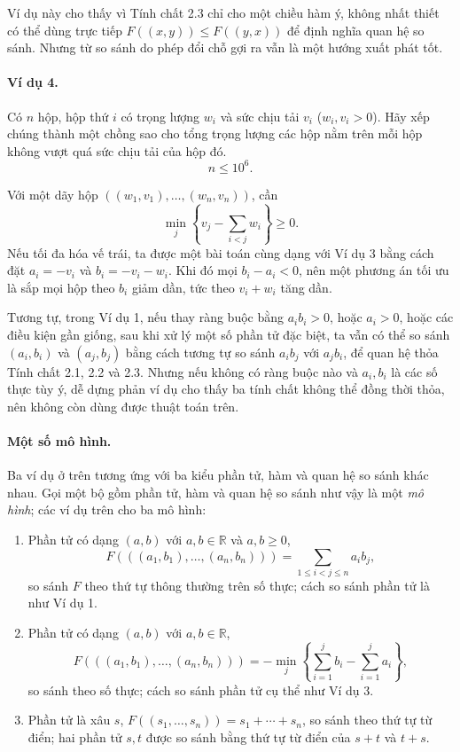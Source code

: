 \documentclass[11pt]{article}
\begin{document}
Ví dụ này cho thấy vì Tính chất 2.3 chỉ cho một chiều hàm ý, không nhất thiết có
thể dùng trực tiếp $F((x,y))\le F((y,x))$ để định nghĩa quan hệ so sánh. Nhưng
từ so sánh do phép đổi chỗ gợi ra vẫn là một hướng xuất phát tốt.

\paragraph{Ví dụ 4.}
Có $n$ hộp, hộp thứ $i$ có trọng lượng $w_i$ và sức chịu tải $v_i$
($w_i,v_i>0$). Hãy xếp chúng thành một chồng sao cho tổng trọng lượng các hộp
nằm trên mỗi hộp không vượt quá sức chịu tải của hộp đó.
\[
  n\le 10^6.
\]

Với một dãy hộp $((w_1,v_1),\ldots,(w_n,v_n))$, cần
\[
  \min_j\left\{v_j-\sum_{i<j} w_i\right\}\ge 0.
\]
Nếu tối đa hóa vế trái, ta được một bài toán cùng dạng với Ví dụ 3 bằng cách đặt
$a_i=-v_i$ và $b_i=-v_i-w_i$. Khi đó mọi $b_i-a_i<0$, nên một phương án tối ưu
là sắp mọi hộp theo $b_i$ giảm dần, tức theo $v_i+w_i$ tăng dần.

Tương tự, trong Ví dụ 1, nếu thay ràng buộc bằng $a_ib_i>0$, hoặc $a_i>0$, hoặc
các điều kiện gần giống, sau khi xử lý một số phần tử đặc biệt, ta vẫn có thể
so sánh $(a_i,b_i)$ và $(a_j,b_j)$ bằng cách tương tự so sánh $a_i b_j$ với
$a_j b_i$, để quan hệ thỏa Tính chất 2.1, 2.2 và 2.3. Nhưng nếu không có ràng
buộc nào và $a_i,b_i$ là các số thực tùy ý, dễ dựng phản ví dụ cho thấy ba tính
chất không thể đồng thời thỏa, nên không còn dùng được thuật toán trên.

\paragraph{Một số mô hình.}
Ba ví dụ ở trên tương ứng với ba kiểu phần tử, hàm và quan hệ so sánh khác
nhau. Gọi một bộ gồm phần tử, hàm và quan hệ so sánh như vậy là một \emph{mô
hình}; các ví dụ trên cho ba mô hình:
\begin{enumerate}
  \item Phần tử có dạng $(a,b)$ với $a,b\in\mathbb R$ và $a,b\ge 0$,
  \[
    F(((a_1,b_1),\ldots,(a_n,b_n)))
    =\sum_{1\le i<j\le n} a_i b_j,
  \]
  so sánh $F$ theo thứ tự thông thường trên số thực; cách so sánh phần tử là
  như Ví dụ 1.
  \item Phần tử có dạng $(a,b)$ với $a,b\in\mathbb R$,
  \[
    F(((a_1,b_1),\ldots,(a_n,b_n)))
    =
    -\min_j\left\{\sum_{i=1}^j b_i-\sum_{i=1}^j a_i\right\},
  \]
  so sánh theo số thực; cách so sánh phần tử cụ thể như Ví dụ 3.
  \item Phần tử là xâu $s$, $F((s_1,\ldots,s_n))=s_1+\cdots+s_n$, so sánh theo
  thứ tự từ điển; hai phần tử $s,t$ được so sánh bằng thứ tự từ điển của
  $s+t$ và $t+s$.
\end{enumerate}
\end{document}
